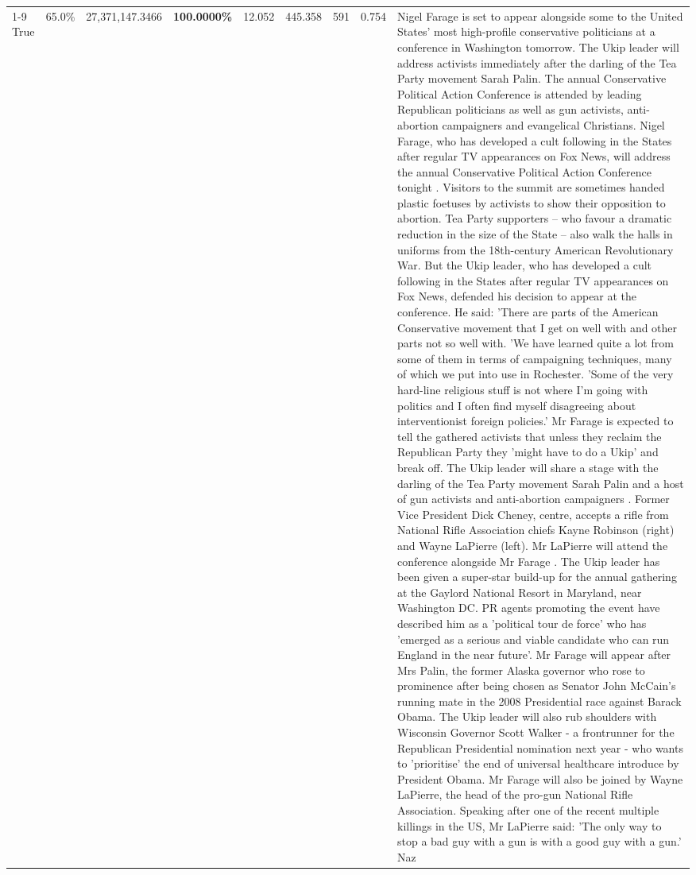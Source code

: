 \begin{table}[H]
\begin{tabular}{lllrlllll}
\cline{1-9}
True & 65.0\% & 27,371,147.3466 & \bfseries \color{red} 100.0000\% & 12.052 & 445.358 & 591 & 0.754 & Nigel Farage is set to appear alongside some to the United States' most high-profile conservative politicians at a conference in Washington tomorrow. The Ukip leader will address activists immediately after the darling of the Tea Party movement Sarah Palin. The annual Conservative Political Action Conference is attended by leading Republican politicians as well as gun activists, anti-abortion campaigners and evangelical Christians. Nigel Farage, who has developed a cult following in the States after regular TV appearances on Fox News, will address the annual Conservative Political Action Conference tonight . Visitors to the summit are sometimes handed plastic foetuses by activists to show their opposition to abortion. Tea Party supporters – who favour a dramatic reduction in the size of the State – also walk the halls in uniforms from the 18th-century American Revolutionary War. But the Ukip leader, who has developed a cult following in the States after regular TV appearances on Fox News, defended his decision to appear at the conference. He said: 'There are parts of the American Conservative movement that I get on well with and other parts not so well with. 'We have learned quite a lot from some of them in terms of campaigning techniques, many of which we put into use in Rochester. 'Some of the very hard-line religious stuff is not where I'm going with politics and I often find myself disagreeing about interventionist foreign policies.' Mr Farage is expected to tell the gathered activists that unless they reclaim the Republican Party they 'might have to do a Ukip' and break off. The Ukip leader will share a stage with the darling of the Tea Party movement Sarah Palin and a host of gun activists and anti-abortion campaigners . Former Vice President Dick Cheney, centre, accepts a rifle from National Rifle Association chiefs Kayne Robinson (right) and Wayne LaPierre (left). Mr LaPierre will attend the conference alongside Mr Farage . The Ukip leader has been given a super-star build-up for the annual gathering at the Gaylord National Resort in Maryland, near Washington DC. PR agents promoting the event have described him as a 'political tour de force' who has 'emerged as a serious and viable candidate who can run England in the near future'. Mr Farage will appear after Mrs Palin, the former Alaska governor who rose to prominence after being chosen as Senator John McCain's running mate in the 2008 Presidential race against Barack Obama. The Ukip leader will also rub shoulders with Wisconsin Governor Scott Walker - a frontrunner for the Republican Presidential nomination next year - who wants to 'prioritise' the end of universal healthcare introduce by President Obama. Mr Farage will also be joined by Wayne LaPierre, the head of the pro-gun National Rifle Association. Speaking after one of the recent multiple killings in the US, Mr LaPierre said: 'The only way to stop a bad guy with a gun is with a good guy with a gun.' Naz \\

\end{tabular}
\end{table}
